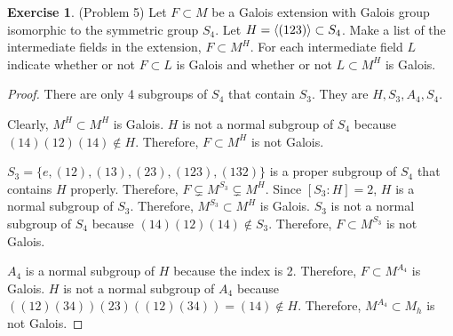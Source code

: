 \documentclass[12pt, psamsfonts]{amsart}
\theoremstyle{definition}
\newtheorem*{exer}{Exercise}
\theoremstyle{remark}
\numberwithin{equation}{section}
\begin{document}
\begin{exer}{(Problem 5)}
  Let $F \subset M$ be a Galois extension with Galois group isomorphic to the symmetric group $S_4$.
  Let $H = \ev{(123)} \subset S_4$.
  Make a list of the intermediate fields in the extension, $F \subset M^H$.
  For each intermediate field $L$ indicate whether or not $F \subset L$ is Galois and whether or not $L \subset M^H$ is Galois.
\end{exer}

\begin{proof}
  There are only 4 subgroups of $S_4$ that contain $S_3$.
  They are $H, S_3, A_4, S_4$.

  Clearly, $M^H \subset M^H$ is Galois.
  $H$ is not a normal subgroup of $S_4$ because $(14)(12)(14) \notin H$.
  Therefore, $F \subset M^H$ is not Galois.

  $S_3 = \{ e, (12), (13), (23), (123), (132) \}$ is a proper subgroup of $S_4$ that contains $H$ properly.
  Therefore, $F \subsetneq M^{S_3} \subsetneq M^H$.
  Since $[S_3:H] = 2$, $H$ is a normal subgroup of $S_3$.
  Therefore, $M^{S_3} \subset M^{H}$ is Galois.
  $S_3$ is not a normal subgroup of $S_4$ because $(14)(12)(14) \notin S_3$.
  Therefore, $F \subset M^{S_3}$ is not Galois.

  $A_4$ is a normal subgroup of $H$ because the index is 2.
  Therefore, $F \subset M^{A_4}$ is Galois.
  $H$ is not a normal subgroup of $A_4$ because $((12)(34))(23)((12)(34)) = (14) \notin H$.
  Therefore, $M^{A_4} \subset M_h$ is not Galois.
\end{proof}
\end{document}
